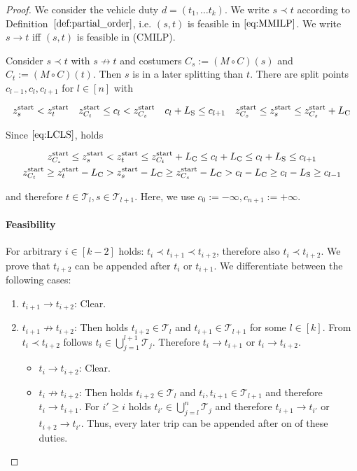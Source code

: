 \begin{proof}

We consider the vehicle duty $d=\left(t_1,\dots t_k\right)$. We write $s\prec t$ according to Definition~$\ref{def:partial_order}$, i.e. $(s,t)$ is feasible in $\eqref{eq:MMILP}$. We write $s\to t$ iff $(s,t)$ is feasible in (CMILP).

Consider $s\prec t$ with $s\not\to t$ and costumers $C_s:=(M\circ C)(s)$ and $C_t:=(M\circ C)(t)$. Then $s$ is in a later splitting than $t$. There are split points $c_{l-1},c_l,c_{l+1}$ for $l\in[n]$ with

\begin{align*}
	z^{\operatorname{start}}_s < z^{\operatorname{start}}_t && z^{\operatorname{start}}_{C_t}\leq c_l <z^{\operatorname{start}}_{C_s} && c_l+L_{\operatorname{S}}\leq c_{l+1} && z^{\operatorname{start}}_{C_s}\leq z^{\operatorname{start}}_s\leq z^{\operatorname{start}}_{C_s}+L_{\operatorname{C}}
\end{align*}

Since $\eqref{eq:LCLS}$, holds

\begin{gather*}
	z^{\operatorname{start}}_{C_s} \leq z^{\operatorname{start}}_s < z^{\operatorname{start}}_t\leq z^{\operatorname{start}}_{C_t}+L_{\operatorname{C}} \leq c_l+L_{\operatorname{C}} \leq c_l+L_{\operatorname{S}} \leq c_{l+1} \\
	z^{\operatorname{start}}_{C_t} \geq z^{\operatorname{start}}_t-L_{\operatorname{C}} > z^{\operatorname{start}}_s-L_{\operatorname{C}} \geq z^{\operatorname{start}}_{C_s}-L_{\operatorname{C}} > c_l-L_{\operatorname{C}}\geq c_l-L_{\operatorname{S}}\geq c_{l-1}
\end{gather*}

and therefore $t\in\mathcal{T}_l,s\in\mathcal{T}_{l+1}$. Here, we use $c_{0}:=-\infty,c_{n+1}:=+\infty$.

\paragraph{Feasibility}

For arbitrary $i\in[k-2]$ holds: $t_i\prec t_{i+1}\prec t_{i+2}$, therefore also $t_i\prec t_{i+2}$. We prove that $t_{i+2}$ can be appended after $t_{i}$ or $t_{i+1}$. We differentiate between the following cases:

\begin{enumerate}
	\item{$t_{i+1}\to t_{i+2}$:}
		Clear.
	\item{$t_{i+1}\not\to t_{i+2}$:}
		Then holds $t_{i+2}\in\mathcal{T}_l$ and $t_{i+1}\in\mathcal{T}_{l+1}$ for some $l\in[k]$. From $t_i\prec t_{i+2}$ follows $t_i\in\bigcup_{j=1}^{l+1}\mathcal{T}_j$. Therefore $t_i\to t_{i+1}$ or $t_i\to t_{i+2}$.
	\begin{itemize}
		\item{$t_i\to t_{i+2}$:}
			Clear.
		\item{$t_i\not\to t_{i+2}$:}
			Then holds $t_{i+2}\in\mathcal{T}_l$ and $t_i,t_{i+1}\in\mathcal{T}_{l+1}$ and therefore $t_i\to t_{i+1}$. For $i'\geq i$ holds $t_{i'}\in\bigcup_{j=l}^n \mathcal{T}_j$ and therefore $t_{i+1}\to t_{i'}$ or $t_{i+2}\to t_{i'}$. Thus, every later trip can be appended after on of these duties.
	\end{itemize}
\end{enumerate}


\end{proof}
